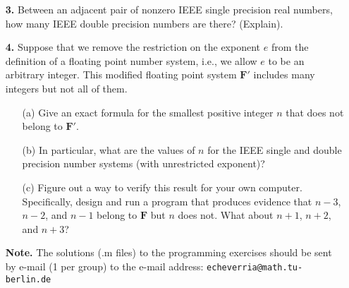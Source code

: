\documentclass[10pt]{report}
\begin{document}
\begin{enumerate}
\item[\textbf{3.}] Between an adjacent pair of nonzero IEEE single precision real numbers, how many IEEE double precision numbers are there? (Explain). 

\vspace{0.1cm} 

\item[\textbf{4.}] Suppose that we remove the restriction on the exponent $e$ from the definition of a floating point number system, i.e., we allow $e$ to be an arbitrary integer. This modified floating point  system $\mathbf{F'}$ includes many integers but not all of them.
  \begin{enumerate}
    \item[(a)] Give an exact formula for the smallest positive integer $n$ that does not belong to $\mathbf{F'}$.
    \item[(b)] In particular, what are the values of $n$ for the IEEE single and double precision number systems (with unrestricted exponent)?
    \item[(c)] Figure out a way to verify this result for your own computer. Specifically, design and run a program that produces evidence that $n-3$, $n-2$, and $n-1$ belong to $\mathbf{F}$ but $n$ does not. What about $n+1$, $n+2$, and $n+3$?
    \end{enumerate}


\item[\textbf{Note.}] The solutions (.m files) to the programming exercises should be sent by e-mail (1 per group) to the e-mail address: \verb+echeverria@math.tu-berlin.de+ \\


\end{enumerate}
\end{document}
